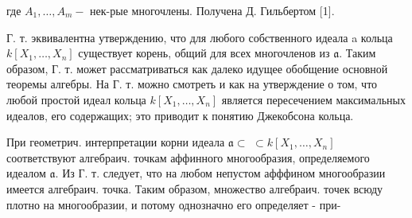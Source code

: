 \documentclass[10pt]{article}
\begin{document}
где $A_{1}, \ldots, A_{m}-$ нек-рые многочлены. Получена Д. Гильбертом [1].



Г. т. эквивалентна утверждению, что для любого собственного идеала a кольца $k\left[X_{1}, \ldots, X_{n}\right]$ существует корень, общий для всех многочленов из $\mathfrak{a}$. Таким образом, Г. т. может рассматриваться как далеко идущее обобщение основной теоремы алгебры. На Г. т. можно смотреть и как на утверждение о том, что любой простой идеал кольца $k\left[X_{1}, \ldots, X_{n}\right]$ является пересечением максимальных идеалов, его содержащих; это приводит к понятию Джекобсона кольца.



При геометрич. интерпретации корни идеала $\mathfrak{a} \subset$ $\subset k\left[X_{1}, \ldots, X_{n}\right]$ соответствуют алгебраич. точкам аффинного многообразия, определяемого идеалом $\mathfrak{a}$. Из Г. т. следует, что на любом непустом афффином многообразии имеется алгебраич. точка. Таким образом, множество алгебраич. точек всюду плотно на многообразии, и потому однозначно его определяет - при-
\end{document}
